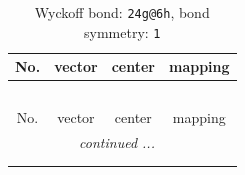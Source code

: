 \documentclass[fleqn,8pt]{jsarticle}
\begin{document}
\renewcommand{\arraystretch}{1.2}
\begin{longtable}{cccc}
\caption{Wyckoff bond: {\tt 24g@6h}, bond symmetry: {\tt 1}}
 \\
 \hline \hline
No. & vector & center & mapping \\ \hline \endfirsthead

\multicolumn{3}{l}{\tablename\ \thetable{}} \\
 \hline \hline
No. & vector & center & mapping \\ \hline \endhead

 \hline \hline
\multicolumn{3}{r}{\footnotesize\it continued ...} \\ \endfoot

 \hline \hline
\multicolumn{3}{r}{} \\ \endlastfoot


\end{longtable}
\end{document}
